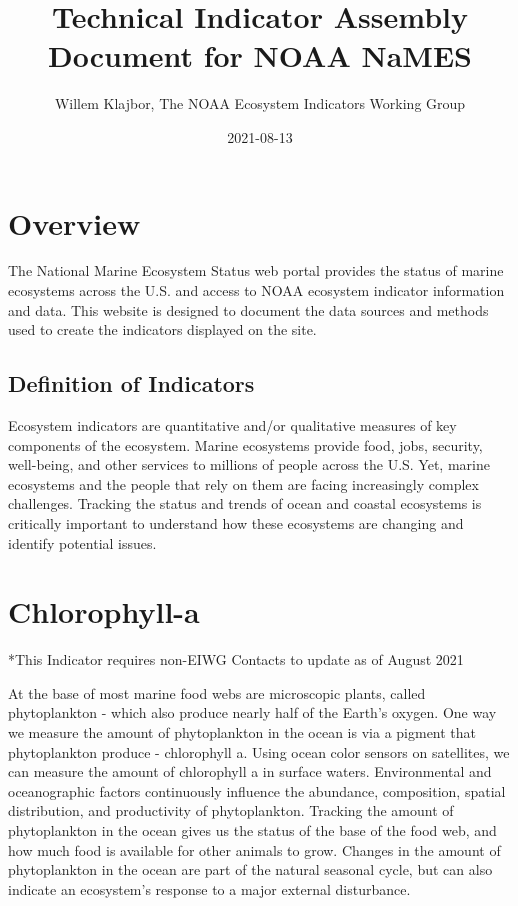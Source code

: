 \documentclass[
]{book}
\title{Technical Indicator Assembly Document for NOAA NaMES}
\author{Willem Klajbor, The NOAA Ecosystem Indicators Working Group}
\date{2021-08-13}
\begin{document}
\maketitle

{
\setcounter{tocdepth}{1}
\tableofcontents
}
\hypertarget{overview}{%
\chapter*{Overview}\label{overview}}

The National Marine Ecosystem Status web portal provides the status of marine ecosystems across the U.S. and access to NOAA ecosystem indicator information and data. This website is designed to document the data sources and methods used to create the indicators displayed on the site.

\hypertarget{definition-of-indicators}{%
\section{Definition of Indicators}\label{definition-of-indicators}}

Ecosystem indicators are quantitative and/or qualitative measures of key components of the ecosystem. Marine ecosystems provide food, jobs, security, well-being, and other services to millions of people across the U.S. Yet, marine ecosystems and the people that rely on them are facing increasingly complex challenges. Tracking the status and trends of ocean and coastal ecosystems is critically important to understand how these ecosystems are changing and identify potential issues.

\hypertarget{chlorophyll-a}{%
\chapter{Chlorophyll-a}\label{chlorophyll-a}}

*This Indicator requires non-EIWG Contacts to update as of August 2021

At the base of most marine food webs are microscopic plants, called phytoplankton - which also produce nearly half of the Earth's oxygen. One way we measure the amount of phytoplankton in the ocean is via a pigment that phytoplankton produce - chlorophyll a. Using ocean color sensors on satellites, we can measure the amount of chlorophyll a in surface waters. Environmental and oceanographic factors continuously influence the abundance, composition, spatial distribution, and productivity of phytoplankton. Tracking the amount of phytoplankton in the ocean gives us the status of the base of the food web, and how much food is available for other animals to grow. Changes in the amount of phytoplankton in the ocean are part of the natural seasonal cycle, but can also indicate an ecosystem's response to a major external disturbance.
\end{document}
